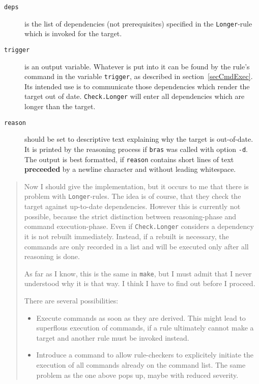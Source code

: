 \documentclass[12pt]{article}
\newcommand{\bras}{\texttt{bras}}
\newcommand{\make}{\texttt{make}}
\begin{document}
{\begin{description}
\item[\texttt{deps}]
is the list of dependencies (not prerequisites)
specified in the \texttt{Longer}-rule which is invoked for the target.

\item[\texttt{trigger}]
is an output variable. Whatever is put into it can be found by the
rule's command in the variable \texttt{trigger}, as described in
section~\ref{secCmdExec}. Its intended use is to communicate those
dependencies which render the target out of
date. \texttt{Check.Longer} will enter all dependencies which are
longer than the target.

\item[\texttt{reason}] should be set to descriptive text explaining
why the target is out-of-date. It is printed by the reasoning process
if \bras{} was called with option \texttt{-d}. The output is best
formatted, if \texttt{reason} contains short lines of text
\textbf{preceeded} by a newline character and without leading
whitespace.
\end{description}



\begin{quote}\sffamily
Now I should give the implementation, but it occurs to me that there
is problem with \texttt{Longer}-rules. The idea is of course, that
they check the target against up-to-date dependencies. However this is
currently not possible, because the strict distinction between
reasoning-phase and command execution-phase. Even if
\texttt{Check.Longer} considers a dependency it is not rebuilt
immediately. Instead, if a rebuilt is necessary, the commands are only
recorded in a list and will be executed only after all reasoning is
done.

As far as I know, this is the same in \make{}, but I must admit that I
never understood why it is that way. I think I have to find out before
I proceed.

There are several possibilities:
\begin{itemize}
\item
Execute commands as soon as they are derived. This might lead to
superflous execution of commands, if a rule ultimately cannot make a
target and another rule must be invoked instead.
\item 
Introduce a command to allow rule-checkers to explicitely initiate the
execution of all commands already on the command list. The same
problem as the one above pops up, maybe with reduced severity.
\end{itemize}


\end{quote}}
\end{document}
